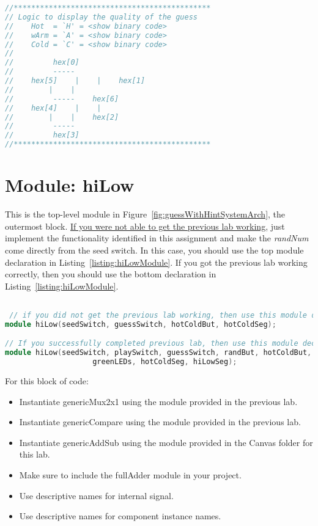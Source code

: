 \begin{lstlisting}[language=Verilog,
 caption={A comment block describing the pattern of illuminated segment for each guess hint..},
 label={listing:hotColdGuess},
 frame=single]
//*********************************************
// Logic to display the quality of the guess
//    Hot  = `H' = <show binary code>
//    wArm = `A' = <show binary code>
//    Cold = `C' = <show binary code>
//
//         hex[0]
//         -----
//    hex[5]    |    |    hex[1]
//        |    |
//         -----    hex[6]
//    hex[4]    |    |
//        |    |    hex[2]
//         -----
//         hex[3]
//*********************************************
\end{lstlisting}

\section{Module: hiLow}
This is the top-level module in Figure~\ref{fig:guessWithHintSystemArch}, the outermost
block. \uline{If you were not able to get the previous lab working}, just
implement the functionality identified in this assignment and make the
\emph{randNum} come directly from the seed switch. In this case, you
should use the top module declaration in Listing~\ref{listing:hiLowModule}. If you got the
previous lab working correctly, then you should use the bottom
declaration in Listing~\ref{listing:hiLowModule}.

\begin{lstlisting}[language=Verilog,
 caption={The module declaration for the enhanced hiLow module if you did or did
 not get the previous lab working.},
 label={listing:hiLowModule},
basicstyle=\tiny\ttfamily,
 frame=single]

 // if you did not get the previous lab working, then use this module declaration
module hiLow(seedSwitch, guessSwitch, hotColdBut, hotColdSeg);

// If you successfully completed previous lab, then use this module declaration (with no line break)
module hiLow(seedSwitch, playSwitch, guessSwitch, randBut, hotColdBut, hiLowBut, randMsbSeg, randLsbSeg,
                    greenLEDs, hotColdSeg, hiLowSeg);
 \end{lstlisting}

For this block of code:

\begin{itemize}
    \item
        Instantiate genericMux2x1 using the module provided in the previous
        lab.
    \item
        Instantiate genericCompare using the module provided in the previous
        lab.
    \item
        Instantiate genericAddSub using the module provided in the Canvas
        folder for this lab.
    \item
        Make sure to include the fullAdder module in your project.
    \item
        Use descriptive names for internal signal.
    \item
        Use descriptive names for component instance names.
\end{itemize}

